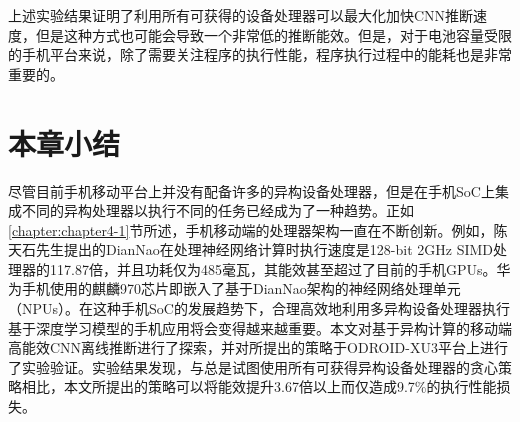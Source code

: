 上述实验结果证明了利用所有可获得的设备处理器可以最大化加快CNN推断速度，但是这种方式也可能会导致一个非常低的推断能效。但是，对于电池容量受限的手机平台来说，除了需要关注程序的执行性能，程序执行过程中的能耗也是非常重要的\cite{brooks2000power}。

\section{本章小结}

尽管目前手机移动平台上并没有配备许多的异构设备处理器，但是在手机SoC上集成不同的异构处理器以执行不同的任务已经成为了一种趋势。正如\ref{chapter:chapter4-1}节所述，手机移动端的处理器架构一直在不断创新。例如，陈天石先生提出的DianNao在处理神经网络计算时执行速度是128-bit 2GHz SIMD处理器的117.87倍，并且功耗仅为485毫瓦\cite{chen2014diannao}，其能效甚至超过了目前的手机GPUs。华为手机使用的麒麟970芯片即嵌入了基于DianNao架构的神经网络处理单元（NPUs）。在这种手机SoC的发展趋势下，合理高效地利用多异构设备处理器执行基于深度学习模型的手机应用将会变得越来越重要。本文对基于异构计算的移动端高能效CNN离线推断进行了探索，并对所提出的策略于ODROID-XU3平台上进行了实验验证。实验结果发现，与总是试图使用所有可获得异构设备处理器的贪心策略相比，本文所提出的策略可以将能效提升3.67倍以上而仅造成9.7\%的执行性能损失。

\cleardoublepage 